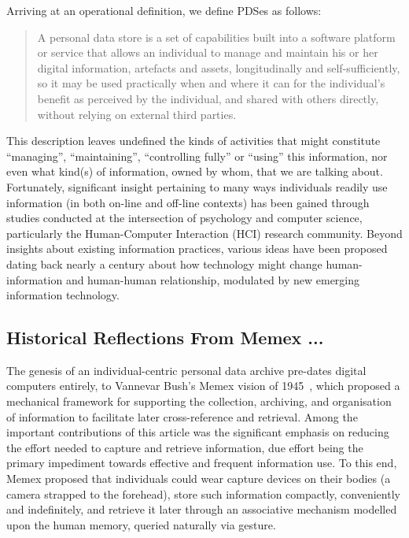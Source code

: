 \documentclass[graybox]{svmult}
\begin{document}
Arriving at an operational definition, we define PDSes as follows:

\begin{quote}

	A personal data store is a set of capabilities built into a software platform or service that allows an individual to manage and maintain his or her digital information, artefacts and assets, longitudinally and self-sufficiently, so it may be used practically when and where it can for the individual’s benefit as perceived by the individual, and shared with others directly, without relying on external third parties. 

\end{quote}

This description leaves undefined the kinds of activities that might constitute ``managing'', ``maintaining'', ``controlling fully'' or ``using'' this information, nor even what kind(s) of information, owned by whom, that we are talking about.  Fortunately, significant insight pertaining to many ways individuals readily use information (in both on-line and off-line contexts) has been gained through studies conducted at the intersection of psychology and computer science, particularly the Human-Computer Interaction (HCI) research community.  Beyond insights about existing information practices, various ideas have been proposed dating back nearly a century about how technology might change human-information and human-human relationship, modulated by new emerging information technology.

\subsection{Historical Reflections From Memex ...}

The genesis of an individual-centric personal data archive pre-dates digital computers entirely, to Vannevar Bush's Memex vision of 1945~\cite{memex}, which proposed a mechanical framework for supporting the collection, archiving, and organisation of information to facilitate later cross-reference and retrieval.  Among the important contributions of this article was the significant emphasis on reducing the effort needed to capture and retrieve information, due effort being the primary impediment towards effective and frequent information use.  To this end, Memex proposed that individuals could wear capture devices on their bodies (a camera strapped to the forehead), store such information compactly, conveniently and indefinitely, and retrieve it later through an associative mechanism modelled upon the human memory, queried naturally via gesture.
\end{document}
